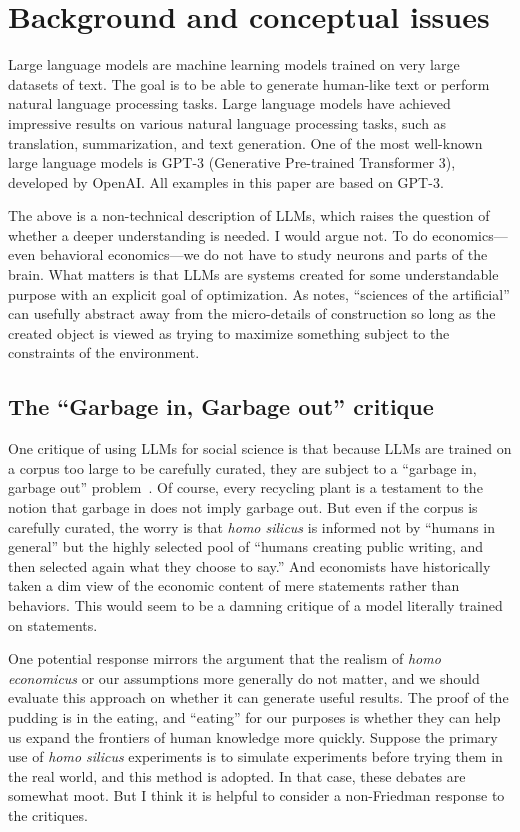 \documentclass[11pt]{article}
\begin{document}
\section{Background and conceptual issues} \label{sec:conceptual_issues}

Large language models are machine learning models trained on very large datasets of text.
The goal is to be able to generate human-like text or perform natural language processing tasks.
Large language models have achieved impressive results on various natural language processing tasks, such as translation, summarization, and text generation.
One of the most well-known large language models is GPT-3 (Generative Pre-trained Transformer 3), developed by OpenAI.
All examples in this paper are based on GPT-3. 

The above is a non-technical description of LLMs, which raises the question of whether a deeper understanding is needed.
I would argue not.
To do economics---even behavioral economics---we do not have to study neurons and parts of the brain.
What matters is that LLMs are systems created for some understandable purpose with an explicit goal of optimization.
As \cite{simon1996} notes, ``sciences of the artificial'' can usefully abstract away from the micro-details of construction so long as the created object is viewed as trying to maximize something subject to the constraints of the environment.

\subsection{The ``Garbage in, Garbage out'' critique}
One critique of using LLMs for social science is that because LLMs are trained on a corpus too large to be carefully curated, they are subject to a ``garbage in, garbage out'' problem~\citep{bender2021}. 
Of course, every recycling plant is a testament to the notion that garbage in does not imply garbage out.
But even if the corpus is carefully curated, the worry is that \emph{homo silicus} is informed not by ``humans in general'' but the highly selected pool of ``humans creating public writing, and then selected again what they choose to say.''
And economists have historically taken a dim view of the economic content of mere statements rather than behaviors.
This would seem to be a damning critique of a model literally trained on statements.  

One potential response mirrors the \cite{friedman1953methodology} argument that the realism of \emph{homo economicus} or our assumptions more generally do not matter, and we should evaluate this approach on whether it can generate useful results.
The proof of the pudding is in the eating, and ``eating'' for our purposes is whether they can help us expand the frontiers of human knowledge more quickly.
Suppose the primary use of \emph{homo silicus} experiments is to simulate experiments before trying them in the real world, and this method is adopted. 
In that case, these debates are somewhat moot. 
But I think it is helpful to consider a non-Friedman response to the critiques.
\end{document}
